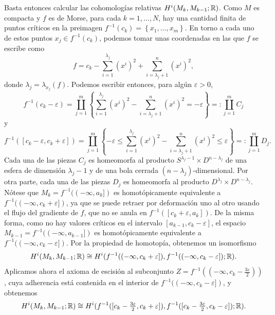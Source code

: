 \documentclass[11pt,a4paper]{amsbook}
\theoremstyle{remark} \newtheorem{rmk}[subsection]{Observación}
\theoremstyle{definition} \newtheorem{defn}[subsection]{Definición}
\theoremstyle{definition} \newtheorem{ex}[subsection]{Ejemplo}
\theoremstyle{definition} \newtheorem{ej}[subsection]{Ejercicio}
\begin{document}
Basta entonces calcular las cohomologías relativas $H^i(M_{k},M_{k-1};\mathbb R)$. Como $M$ es compacta y $f$ es de Morse, para cada $k=1,\dots,N$, hay una cantidad finita de puntos críticos en la preimagen $f^{-1}(c_k)=\left\{ x_1,\dots,x_m \right\}$. En torno a cada uno de estos puntos $x_j\in f^{-1}(c_k)$, podemos tomar unas coordenadas en las que $f$ se escribe como
  \begin{equation*}
f = c_k - \sum_{i=1}^{\lambda_j}(x^i)^2 + \sum_{i=\lambda_j + 1}^n (x^i)^2,
  \end{equation*}
donde $\lambda_j = \lambda_{x_j}(f)$. Podemos escribir entonces, para algún $\varepsilon>0$,
\begin{equation*}
f^{-1}(c_k-\varepsilon) = \coprod_{j=1}^m \left\{ \sum_{i=1}^{\lambda_j}(x^i)^2 - \sum_{i=\lambda_j + 1}^n (x^i)^2 = - \varepsilon \right\} =: \coprod_{j=1}^m C_j
\end{equation*}
y
\begin{equation*}
f^{-1}([c_k-\varepsilon,c_k+\varepsilon]) = \coprod_{j=1}^m \left\{ -\varepsilon \leq \sum_{i=1}^{\lambda_j}(x^i)^2 - \sum_{i=\lambda_j + 1}^n (x^i)^2 \leq \varepsilon \right\} =: \coprod_{j=1}^m D_j.
\end{equation*}
Cada una de las piezas $C_j$ es homeomorfa al producto $S^{\lambda_j-1} \times D^{n-\lambda_j}$ de una esfera de dimensión $\lambda_j-1$ y de una bola cerrada $(n-\lambda_j)$-dimensional. Por otra parte, cada una de las piezas $D_j$ es homeomorfa al producto $D^{\lambda_j}\times D^{n-\lambda_j}$. Nótese que $M_{k}=f^{-1}((-\infty,a_k])$ es homotópicamente equivalente a $f^{-1}((-\infty,c_k+\varepsilon])$, ya que se puede retraer por deformación uno al otro usando el flujo del gradiente de $f$, que no se anula en $f^{-1}([c_k+\varepsilon, a_{k}])$. De la misma forma, como no hay valores críticos en el intervalo $[a_{k-1},c_k-\varepsilon]$, el espacio $M_{k-1}=f^{-1}((-\infty,a_{k-1}])$ es homotópicamente equivalente a $f^{-1}((-\infty,c_{k}-\varepsilon])$.
Por la propiedad de homotopía, obtenemos un isomorfismo
\begin{equation*}
H^i(M_{k},M_{k-1};\mathbb R) \cong H^i(f^{-1}((-\infty,c_k+\varepsilon]), f^{-1}((-\infty,c_k-\varepsilon]);\mathbb R).
\end{equation*}
Aplicamos ahora el axioma de escisión al subconjunto $Z=f^{-1}((-\infty,c_k-\tfrac{3\varepsilon}{2}))$, cuya adherencia está contenida en el interior de $f^{-1}((-\infty,c_k-\varepsilon])$, y obtenemos
\begin{equation*}
H^i(M_{k},M_{k-1};\mathbb R) \cong H^i(f^{-1}([c_k-\tfrac{3\varepsilon}{2},c_k+\varepsilon]), f^{-1}([c_k-\tfrac{3\varepsilon}{2},c_k-\varepsilon]);\mathbb R).
\end{equation*}
\end{document}
